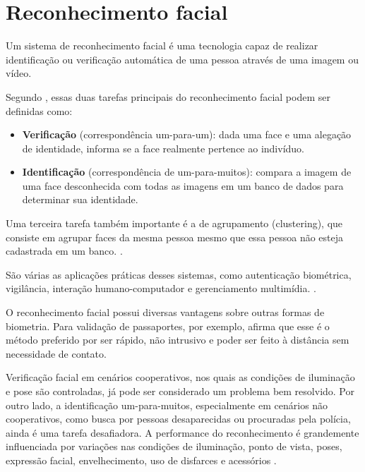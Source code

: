 \chapter{Reconhecimento facial}\label{cap:reconhecimento_facial}

Um sistema de reconhecimento facial é uma tecnologia capaz de realizar identificação ou verificação automática de uma pessoa através de uma imagem ou vídeo. 

Segundo , essas duas tarefas principais do reconhecimento facial podem ser definidas como:
%
\begin{itemize}
\item \textbf{Verificação} (correspondência um-para-um): dada uma face e uma alegação de identidade, informa se a face realmente pertence ao indivíduo.  

\item \textbf{Identificação} (correspondência de um-para-muitos): compara a imagem de uma face desconhecida com todas as imagens em um banco de dados para determinar sua identidade.
\end{itemize}

Uma terceira tarefa também importante é a de agrupamento (clustering), que consiste em agrupar faces da mesma pessoa mesmo que essa pessoa não esteja cadastrada em um banco. \cite{dhingra2017face, schroff2015facenet}.

São várias as aplicações práticas desses sistemas, como autenticação biométrica, vigilância, interação humano-computador e gerenciamento multimídia. \cite{jain2011handbook}.

O reconhecimento facial possui diversas vantagens sobre outras formas de biometria. Para validação de passaportes, por exemplo,  afirma que esse é o método preferido por ser rápido, não intrusivo e poder ser feito à distância sem necessidade de contato.

Verificação facial em cenários cooperativos, nos quais as condições de iluminação e pose são controladas, já pode ser considerado um problema bem resolvido. Por outro lado, a identificação um-para-muitos, especialmente em cenários não cooperativos, como busca por pessoas desaparecidas ou procuradas pela polícia, ainda é uma tarefa desafiadora.
A performance do reconhecimento é grandemente influenciada por variações nas condições de iluminação, ponto de vista, poses, expressão facial, envelhecimento, uso de disfarces e acessórios \cite{li2016kernel, jain2011handbook}.

